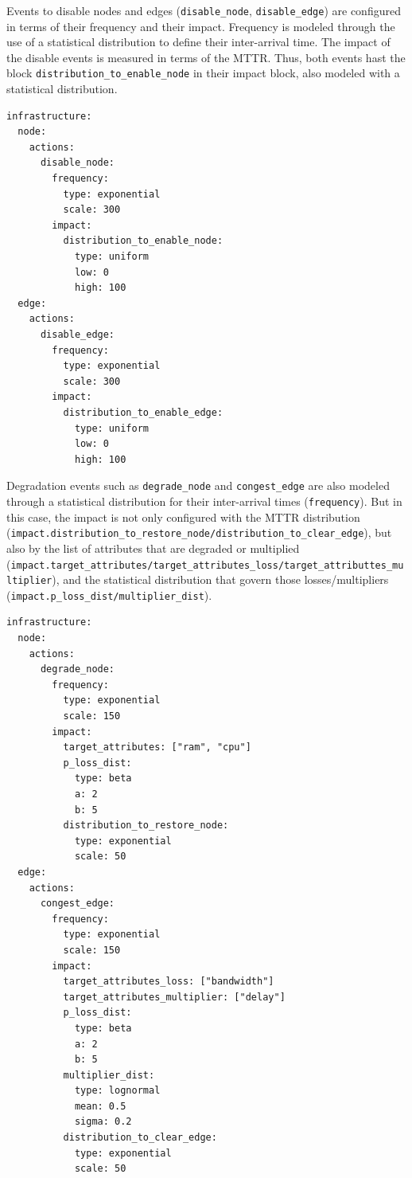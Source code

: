 \documentclass[ASNA]{USG} %
\begin{document}
Events to disable nodes and edges (\texttt{disable\_node}, \texttt{disable\_edge}) are configured in terms of their frequency and their impact. Frequency is modeled through the use of a statistical distribution to define their inter-arrival time. The impact of the disable events is measured in terms of the MTTR. Thus, both events hast the block \texttt{distribution\_to\_enable\_node} in their impact block, also modeled with a statistical distribution.

\begin{lstlisting}[caption={YAML configuration for disable events of infrastructure elements},label=lst:global_spawner_yaml, basicstyle=\fontsize{8}{10}\selectfont\ttfamily]
infrastructure:
  node:
    actions:
      disable_node:
        frequency:
          type: exponential
          scale: 300
        impact:
          distribution_to_enable_node:
            type: uniform
            low: 0
            high: 100
  edge:
    actions:
      disable_edge:
        frequency:
          type: exponential
          scale: 300
        impact:
          distribution_to_enable_edge:
            type: uniform
            low: 0
            high: 100            
\end{lstlisting}


Degradation events such as \texttt{degrade\_node} and  \texttt{congest\_edge} are also modeled through a statistical distribution for their inter-arrival times (\texttt{frequency}). But in this case, the impact is not only configured with the MTTR distribution (\texttt{impact.distribution\_to\_restore\_node/distribution\_to\_clear\_edge}), but also by the list of attributes that are degraded or multiplied (\texttt{impact.target\_attributes/target\_attributes\_loss/target\_attributtes\_multiplier}), and the statistical distribution that govern those losses/multipliers (\texttt{impact.p\_loss\_dist/multiplier\_dist}). 


\begin{lstlisting}[caption={YAML configuration for degrade events of infrastructure elements},label=lst:global_spawner_yaml, basicstyle=\fontsize{8}{10}\selectfont\ttfamily]
infrastructure:
  node:
    actions:
      degrade_node:
        frequency:
          type: exponential
          scale: 150
        impact:
          target_attributes: ["ram", "cpu"]
          p_loss_dist:
            type: beta
            a: 2
            b: 5
          distribution_to_restore_node:
            type: exponential
            scale: 50
  edge:
    actions:
      congest_edge:
        frequency:
          type: exponential
          scale: 150
        impact:
          target_attributes_loss: ["bandwidth"]
          target_attributes_multiplier: ["delay"]
          p_loss_dist:
            type: beta
            a: 2
            b: 5
          multiplier_dist:
            type: lognormal
            mean: 0.5
            sigma: 0.2
          distribution_to_clear_edge:
            type: exponential
            scale: 50        
\end{lstlisting}
\end{document}
